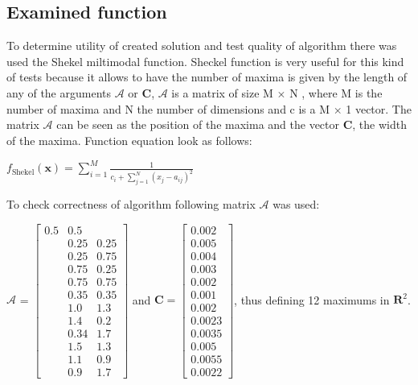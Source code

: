\documentclass[a4paper]{article}
\begin{document}
\subsection{Examined function}
To determine utility of created solution and test quality of algorithm there was used the Shekel miltimodal function. 
Sheckel function is very useful for this kind of tests because it allows to have the number of maxima is given by the length of any of the 
arguments $\mathcal{A}$ or $\mathbf{C}$, $\mathcal{A}$ is a matrix of size M $\times$ N , where M is the number of maxima and N the number 
of dimensions and c is a M $\times$ 1 vector. The matrix $\mathcal{A}$ can be seen as the position of the maxima and the vector $\mathbf{C}$, the width 
of the maxima. Function equation look as follows: \\
\begin{center}
$f_\text{Shekel}(\mathbf{x}) = \sum_{i = 1}^{M} \frac{1}{c_{i} + \sum_{j = 1}^{N} (x_{j} - a_{ij})^2 }$
\\
\end{center}
To check correctness of algorithm following matrix $\mathcal{A}$ was used: \\
\begin{center}
$\mathcal{A}$ = $
\begin{bmatrix} 0.5 & 0.5 \\ & 0.25 & 0.25 \\ & 0.25 & 0.75 \\ & 
            0.75 & 0.25 \\ & 0.75 & 0.75 \\ & 0.35 & 0.35 \\ &
            1.0 & 1.3 \\ & 1.4 & 0.2 \\ & 0.34 & 1.7 \\ &
            1.5 & 1.3 \\ & 1.1 & 0.9 \\ & 0.9 & 1.7
\end{bmatrix}$ and $\mathbf{C} = 
\begin{bmatrix} 0.002 \\ 0.005 \\ 0.004 \\
            0.003 \\ 0.002 \\ 0.001 \\
            0.002 \\ 0.0023 \\ 0.0035 \\
            0.005 \\ 0.0055 \\ 0.0022 
\end{bmatrix}$, thus defining 12 maximums in $\mathbf{R}^2$. 
\end{center}
\end{document}
